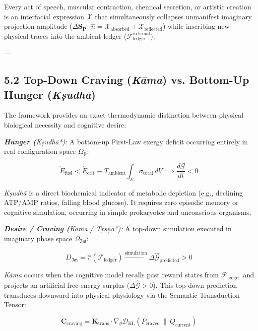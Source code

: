 \documentclass[11pt,a4paper]{article}
\theoremstyle{definition}
\theoremstyle{remark}
\begin{document}
   Every act of speech, muscular contraction, chemical secretion, or artistic creation is an interfacial expression $\boldsymbol{\mathcal{X}}$ that simultaneously collapses unmanifest imaginary projection amplitude ($\Delta \mathbf{S}_{\mathbf{P}} \cdot \hat{n} = \mathcal{X}_{\text{absorbed}} + \mathcal{X}_{\text{reflected}}$) while inscribing new physical traces into the ambient ledger ($\mathcal{F}_{\text{ledger}}^{\text{external}}$).

---

\subsection{5.2 Top-Down Craving (\textit{Kāma}) vs. Bottom-Up Hunger (\textit{Kṣudhā})}
The framework provides an exact thermodynamic distinction between physical biological necessity and cognitive desire:

\textit{ \textbf{Hunger (}Kṣudhā*):}  
  A bottom-up First-Law exergy deficit occurring entirely in real configuration space $\Omega_{\mathbb{R}}$:
  
\begin{equation}
\dot{E}_{\text{fuel}} < \dot{E}_{\text{crit}} \equiv T_{\text{ambient}} \int_E \sigma_{\text{total}} \, dV \implies \frac{d\mathcal{G}}{dt} < 0
\end{equation}

  \textit{Kṣudhā} is a direct biochemical indicator of metabolic depletion (e.g., declining ATP/AMP ratios, falling blood glucose). It requires zero episodic memory or cognitive simulation, occurring in simple prokaryotes and unconscious organisms.

\textit{ \textbf{Desire / Craving (}Kāma / Tṛṣṇā*):}  
  A top-down simulation executed in imaginary phase space $\Omega_{\mathfrak{Im}}$:
  
\begin{equation}
D_{\mathfrak{Im}} = \hat{\pi}(\mathcal{F}_{\text{ledger}}) \xrightarrow{\text{simulation}} \Delta \hat{\mathcal{G}}_{\text{predicted}} > 0
\end{equation}

  \textit{Kāma} occurs when the cognitive model recalls past reward states from $\mathcal{F}_{\text{ledger}}$ and projects an artificial free-energy surplus ($\Delta \hat{\mathcal{G}} > 0$). This top-down prediction transduces downward into physical physiology via the Semantic Transduction Tensor:
  
\begin{equation}
\mathbf{C}_{\text{craving}} = \mathbf{K}_{\text{trans}} \cdot \nabla_\theta \mathcal{D}_{\text{KL}}\left( P_{\text{craved}} \,\|\, Q_{\text{current}} \right)
\end{equation}
\end{document}
